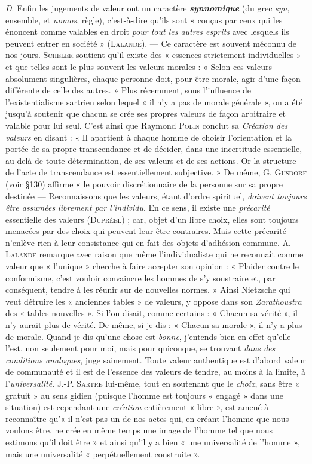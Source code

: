 {\it D}. Enfin les jugements de valeur ont un caractère \textbf{\textit {synnomique}}
(du grec {\it syn}, ensemble, et {\it nomos}, règle), c’est-à-dire
qu'ils sont « conçus par ceux qui les énoncent comme valables en droit
{\it pour tout les autres esprits}
avec lesquels ils peuvent entrer en société » (\textsc{Lalande}).
— Ce caractère est souvent méconnu de nos jours. \textsc{Scheler} soutient
qu’il existe des « essences strictement individuelles » et que telles
sont le plus souvent les valeurs morales : « Selon ces valeurs
absolument singulières, chaque personne doit, pour être morale, agir d'une
façon différente de celle des autres. » Plus récemment, sous l’influence
de l’existentialisme sartrien selon lequel « il n’y a pas de morale
générale », on a été jusqu’à soutenir que chacun se crée ses propres
valeurs de façon arbitraire et valable pour lui seul. C'est ainsi que
Raymond \textsc{Polin} conclut sa {\it Création des valeurs} en disant : « Il
apartient à chaque homme de choisir l'orientation et la portée de sa
propre transcendance et de décider, dans une incertitude essentielle,
au delà de toute détermination, de ses valeurs et de ses actions. Or la
structure de l’acte de transcendance est essentiellement subjective. »
De même, G. \textsc{Gusdorf} (voir \S 130) affirme « le pouvoir discrétionnaire
de la personne sur sa propre destinée — Reconnaissons que les
valeurs, étant d’ordre spirituel, {\it doivent toujours être assumées librement
par l'individu}. En ce sens, il existe une {\it précarité} essentielle des
valeurs (\textsc{Dupréel}) ; car, objet d’un libre choix, elles sont toujours
menacées par des choix qui peuvent leur être contraires. Mais cette
précarité n’enlève rien à leur consistance qui en fait des objets d'adhésion
commune. A. \textsc{Lalande} remarque avec raison que même l’individualiste
qui ne reconnaît comme valeur que « l’unique » cherche
à faire accepter son opinion : « Plaider contre le conformisme, c’est
vouloir convaincre les hommes de s’y soustraire et, par conséquent,
tendre à les réunir sur de nouvelles normes. » Ainsi Nietzsche qui
veut détruire les « anciennes tables » de valeurs, y oppose dans son
{\it Zarathoustra} des « tables nouvelles ». Si l'on disait, comme certains :
« Chacun sa vérité », il n’y aurait plus de vérité. De même, si je dis :
« Chacun sa morale », il n’y a plus de morale. Quand je dis qu’une
chose est {\it bonne}, j'entends bien en effet qu’elle l’est, non seulement
pour moi, mais pour quiconque, se trouvant {\it dans des conditions analogues},
juge sainement. Toute valeur authentique est d’abord valeur
de communauté et il est de l’essence des valeurs de tendre, au moins
à la limite, à l’{\it universalité}. J.-P. \textsc{Sartre} lui-même, tout en soutenant
que le {\it choix}, sans être « gratuit » au sens gidien (puisque l’homme est
toujours « engagé » dans une situation) est cependant une {\it création}
entièrement « libre », est amené à reconnaître qu’« il n’est pas un de
nos actes qui, en créant l’homme que nous voulons être, ne crée en
même temps une image de l’homme tel que nous estimons qu’il doit
être » et ainsi qu’il y a bien « une universalité de l’homme », mais une
universalité « perpétuellement construite ».

